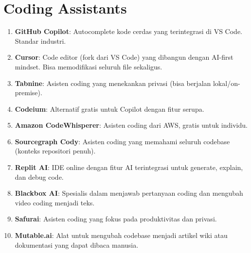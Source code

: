 \section{Coding Assistants}
\begin{enumerate}
    \item \textbf{GitHub Copilot}: Autocomplete kode cerdas yang terintegrasi di VS Code. Standar industri.
    \item \textbf{Cursor}: Code editor (fork dari VS Code) yang dibangun dengan AI-first mindset. Bisa memodifikasi seluruh file sekaligus.
    \item \textbf{Tabnine}: Asisten coding yang menekankan privasi (bisa berjalan lokal/on-premise).
    \item \textbf{Codeium}: Alternatif gratis untuk Copilot dengan fitur serupa.
    \item \textbf{Amazon CodeWhisperer}: Asisten coding dari AWS, gratis untuk individu.
    \item \textbf{Sourcegraph Cody}: Asisten coding yang memahami seluruh codebase (konteks repositori penuh).
    \item \textbf{Replit AI}: IDE online dengan fitur AI terintegrasi untuk generate, explain, dan debug code.
    \item \textbf{Blackbox AI}: Spesialis dalam menjawab pertanyaan coding dan mengubah video coding menjadi teks.
    \item \textbf{Safurai}: Asisten coding yang fokus pada produktivitas dan privasi.
    \item \textbf{Mutable.ai}: Alat untuk mengubah codebase menjadi artikel wiki atau dokumentasi yang dapat dibaca manusia.
\end{enumerate}

